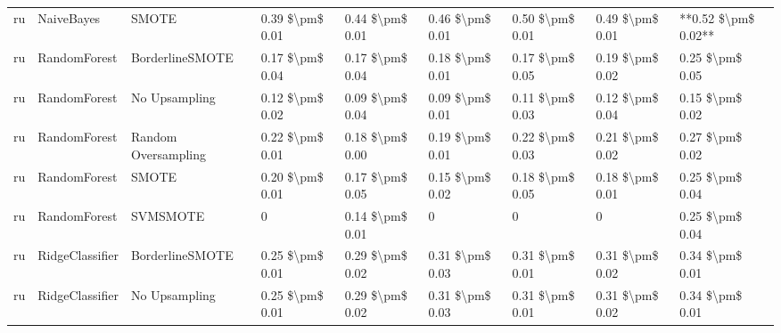 \begin{tabular}{lllllllll}
      ru &                      NaiveBayes &                         SMOTE & 0.39 \$\textbackslash pm\$ 0.01 &           0.44 \$\textbackslash pm\$ 0.01 &       0.46 \$\textbackslash pm\$ 0.01 &        0.50 \$\textbackslash pm\$ 0.01 &                         0.49 \$\textbackslash pm\$ 0.01 & **0.52 \$\textbackslash pm\$ 0.02** \\
      ru &                    RandomForest &               BorderlineSMOTE & 0.17 \$\textbackslash pm\$ 0.04 &           0.17 \$\textbackslash pm\$ 0.04 &       0.18 \$\textbackslash pm\$ 0.01 &        0.17 \$\textbackslash pm\$ 0.05 &                         0.19 \$\textbackslash pm\$ 0.02 &     0.25 \$\textbackslash pm\$ 0.05 \\
      ru &                    RandomForest &                 No Upsampling & 0.12 \$\textbackslash pm\$ 0.02 &           0.09 \$\textbackslash pm\$ 0.04 &       0.09 \$\textbackslash pm\$ 0.01 &        0.11 \$\textbackslash pm\$ 0.03 &                         0.12 \$\textbackslash pm\$ 0.04 &     0.15 \$\textbackslash pm\$ 0.02 \\
      ru &                    RandomForest &           Random Oversampling & 0.22 \$\textbackslash pm\$ 0.01 &           0.18 \$\textbackslash pm\$ 0.00 &       0.19 \$\textbackslash pm\$ 0.01 &        0.22 \$\textbackslash pm\$ 0.03 &                         0.21 \$\textbackslash pm\$ 0.02 &     0.27 \$\textbackslash pm\$ 0.02 \\
      ru &                    RandomForest &                         SMOTE & 0.20 \$\textbackslash pm\$ 0.01 &           0.17 \$\textbackslash pm\$ 0.05 &       0.15 \$\textbackslash pm\$ 0.02 &        0.18 \$\textbackslash pm\$ 0.05 &                         0.18 \$\textbackslash pm\$ 0.01 &     0.25 \$\textbackslash pm\$ 0.04 \\
      ru &                    RandomForest &                      SVMSMOTE &               0 &           0.14 \$\textbackslash pm\$ 0.01 &                     0 &                      0 &                                       0 &     0.25 \$\textbackslash pm\$ 0.04 \\
      ru &                 RidgeClassifier &               BorderlineSMOTE & 0.25 \$\textbackslash pm\$ 0.01 &           0.29 \$\textbackslash pm\$ 0.02 &       0.31 \$\textbackslash pm\$ 0.03 &        0.31 \$\textbackslash pm\$ 0.01 &                         0.31 \$\textbackslash pm\$ 0.02 &     0.34 \$\textbackslash pm\$ 0.01 \\
      ru &                 RidgeClassifier &                 No Upsampling & 0.25 \$\textbackslash pm\$ 0.01 &           0.29 \$\textbackslash pm\$ 0.02 &       0.31 \$\textbackslash pm\$ 0.03 &        0.31 \$\textbackslash pm\$ 0.01 &                         0.31 \$\textbackslash pm\$ 0.02 &     0.34 \$\textbackslash pm\$ 0.01 \\

\end{tabular}
